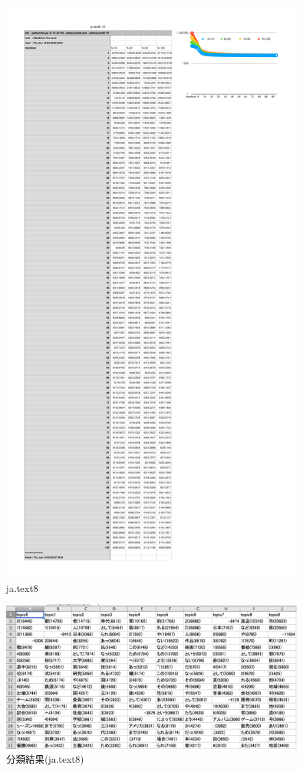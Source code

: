 \documentclass[uplatex,dvipdfmx]{jsarticle}
\begin{document}
\begin{figure}[htb]
\includegraphics[width=13cm,pagebox=cropbox]{jatext8.pdf}
\caption{ja.text8}
\end{figure}

\begin{figure}[ht]
\includegraphics[width=16cm]{jatext810.png}
\caption{分類結果(ja.text8)}
\end{figure}
\end{document}
